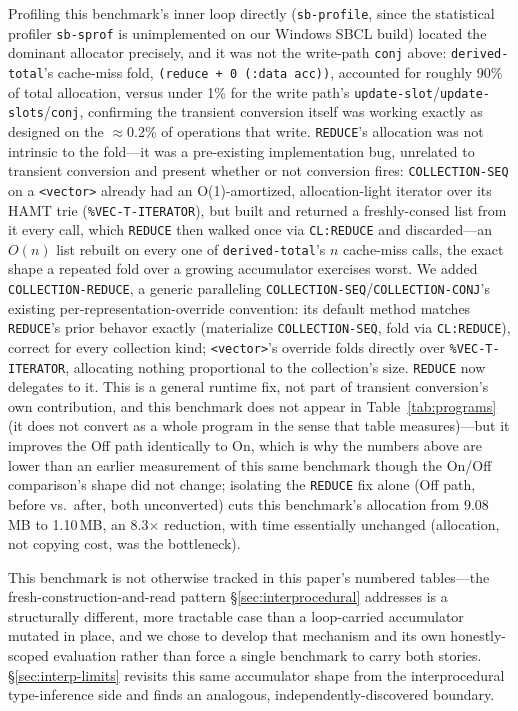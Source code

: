 \documentclass[sigplan,review,anonymous]{acmart}
\begin{document}
Profiling this benchmark's inner loop directly (\texttt{sb-profile}, since the statistical profiler \texttt{sb-sprof} is unimplemented on our Windows SBCL build) located the dominant allocator precisely, and it was not the write-path \texttt{conj} above: \texttt{derived-total}'s cache-miss fold, \texttt{(reduce + 0 (:data acc))}, accounted for roughly 90\% of total allocation, versus under 1\% for the write path's \texttt{update-slot}/\texttt{update-slots}/\texttt{conj}, confirming the transient conversion itself was working exactly as designed on the $\approx$0.2\% of operations that write. \texttt{REDUCE}'s allocation was not intrinsic to the fold---it was a pre-existing implementation bug, unrelated to transient conversion and present whether or not conversion fires: \texttt{COLLECTION-SEQ} on a \texttt{<vector>} already had an O(1)-amortized, allocation-light iterator over its HAMT trie (\texttt{\%VEC-T-ITERATOR}), but built and returned a freshly-consed list from it every call, which \texttt{REDUCE} then walked once via \texttt{CL:REDUCE} and discarded---an $O(n)$ list rebuilt on every one of \texttt{derived-total}'s $n$ cache-miss calls, the exact shape a repeated fold over a growing accumulator exercises worst. We added \texttt{COLLECTION-REDUCE}, a generic paralleling \texttt{COLLECTION-SEQ}/\texttt{COLLECTION-CONJ}'s existing per-representation-override convention: its default method matches \texttt{REDUCE}'s prior behavor exactly (materialize \texttt{COLLECTION-SEQ}, fold via \texttt{CL:REDUCE}), correct for every collection kind; \texttt{<vector>}'s override folds directly over \texttt{\%VEC-T-ITERATOR}, allocating nothing proportional to the collection's size. \texttt{REDUCE} now delegates to it. This is a general runtime fix, not part of transient conversion's own contribution, and this benchmark does not appear in Table~\ref{tab:programs} (it does not convert as a whole program in the sense that table measures)---but it improves the Off path identically to On, which is why the numbers above are lower than an earlier measurement of this same benchmark though the On/Off comparison's shape did not change; isolating the \texttt{REDUCE} fix alone (Off path, before vs.\ after, both unconverted) cuts this benchmark's allocation from 9.08\,MB to 1.10\,MB, an 8.3$\times$ reduction, with time essentially unchanged (allocation, not copying cost, was the bottleneck).

This benchmark is not otherwise tracked in this paper's numbered tables---the fresh-construction-and-read pattern §\ref{sec:interprocedural} addresses is a structurally different, more tractable case than a loop-carried accumulator mutated in place, and we chose to develop that mechanism and its own honestly-scoped evaluation rather than force a single benchmark to carry both stories. §\ref{sec:interp-limits} revisits this same accumulator shape from the interprocedural type-inference side and finds an analogous, independently-discovered boundary.
\end{document}
